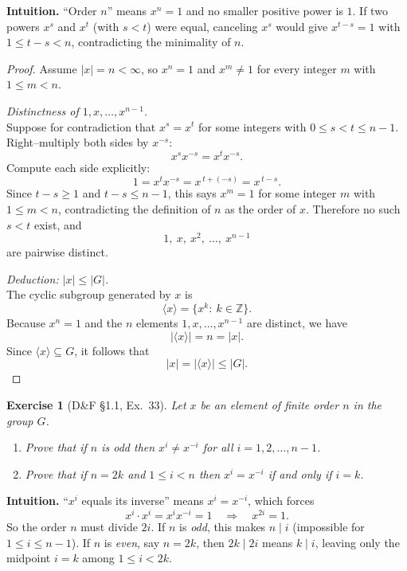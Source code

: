 \documentclass[12pt]{article}
\newtheorem{exercise}[theorem]{Exercise}
\theoremstyle{definition}
\begin{document}
\noindent
\textbf{Intuition.}
“Order $n$” means $x^n=1$ and no smaller positive power is $1$. If two powers $x^s$ and $x^t$ (with $s<t$)
were equal, canceling $x^s$ would give $x^{t-s}=1$ with $1\le t-s<n$, contradicting the minimality of $n$.

\dotfill

\begin{proof}
Assume $|x|=n<\infty$, so $x^n=1$ and $x^m\ne 1$ for every integer $m$ with $1\le m<n$.

\dotfill

\noindent\emph{Distinctness of $1,x,\dots,x^{n-1}$.}\\

\noindent
Suppose for contradiction that $x^s=x^t$ for some integers with $0\le s<t\le n-1$.
Right–multiply both sides by $x^{-s}$:
\[
x^s x^{-s}=x^t x^{-s}.
\]
Compute each side explicitly:
\[
1 = x^{t}x^{-s}=x^{\,t+(-s)}=x^{\,t-s}.
\]
Since $t-s\ge 1$ and $t-s\le n-1$, this says $x^{m}=1$ for some integer $m$ with $1\le m<n$,
contradicting the definition of $n$ as the order of $x$. Therefore no such $s<t$ exist, and
\[
1,\ x,\ x^2,\ \dots,\ x^{n-1}
\]
are pairwise distinct.

\dotfill

\noindent\emph{Deduction: $|x|\le |G|$.}\\

\noindent
The cyclic subgroup generated by $x$ is
\[
\langle x\rangle=\{x^k:\ k\in\mathbb{Z}\}.
\]
Because $x^n=1$ and the $n$ elements $1,x,\dots,x^{n-1}$ are distinct, we have
\[
\lvert\langle x\rangle\rvert=n=|x|.
\]
Since $\langle x\rangle\subseteq G$, it follows that
\[
|x|=\lvert\langle x\rangle\rvert\le |G|.
\]
\end{proof}

\newpage

\begin{exercise}[D\&F §1.1, Ex.~33]
Let $x$ be an element of finite order $n$ in the group $G$.
\begin{enumerate}
\item Prove that if $n$ is odd then $x^i\neq x^{-i}$ for all $i=1,2,\dots,n-1$.
\item Prove that if $n=2k$ and $1\le i<n$ then $x^i=x^{-i}$ if and only if $i=k$.
\end{enumerate}
\end{exercise}

\dotfill

\noindent
\textbf{Intuition.}
“$x^i$ equals its inverse” means $x^i=x^{-i}$, which forces
\[
x^{i}\cdot x^{i}=x^{i}x^{-i}=1 \quad\Longrightarrow\quad x^{2i}=1.
\]
So the order $n$ must divide $2i$. If $n$ is \emph{odd}, this makes $n\mid i$ (impossible for $1\le i\le n-1$).
If $n$ is \emph{even}, say $n=2k$, then $2k\mid 2i$ means $k\mid i$, leaving only the midpoint $i=k$ among
$1\le i<2k$.
\end{document}
